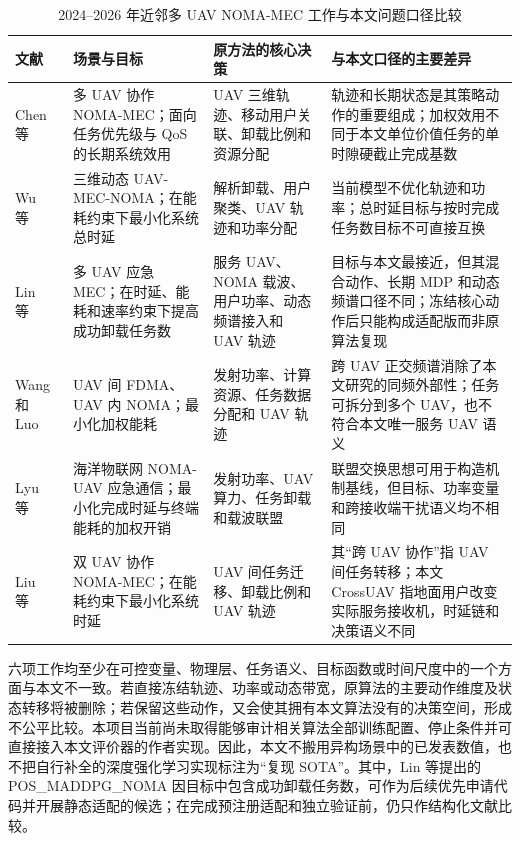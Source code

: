 \begin{table}[htbp]
  \centering
  \caption{2024--2026 年近邻多 UAV NOMA-MEC 工作与本文问题口径比较}
  \label{tab:recent-noma-uav-mec}
  \scriptsize
  \renewcommand{\arraystretch}{1.15}
  \begin{tabular}{p{1.8cm}p{3.2cm}p{4.1cm}p{4.6cm}}
    \toprule
    文献 & 场景与目标 & 原方法的核心决策 & 与本文口径的主要差异 \\
    \midrule
    Chen 等~\cite{chen2026qos} & 多 UAV 协作 NOMA-MEC；面向任务优先级与 QoS 的长期系统效用 & UAV 三维轨迹、移动用户关联、卸载比例和资源分配 & 轨迹和长期状态是其策略动作的重要组成；加权效用不同于本文单位价值任务的单时隙硬截止完成基数 \\
    Wu 等~\cite{wu2025multiagentnoma} & 三维动态 UAV-MEC-NOMA；在能耗约束下最小化系统总时延 & 解析卸载、用户聚类、UAV 轨迹和功率分配 & 当前模型不优化轨迹和功率；总时延目标与按时完成任务数目标不可直接互换 \\
    Lin 等~\cite{lin2025drlresource} & 多 UAV 应急 MEC；在时延、能耗和速率约束下提高成功卸载任务数 & 服务 UAV、NOMA 载波、用户功率、动态频谱接入和 UAV 轨迹 & 目标与本文最接近，但其混合动作、长期 MDP 和动态频谱口径不同；冻结核心动作后只能构成适配版而非原算法复现 \\
    Wang 和 Luo~\cite{wang2024energyefficient} & UAV 间 FDMA、UAV 内 NOMA；最小化加权能耗 & 发射功率、计算资源、任务数据分配和 UAV 轨迹 & 跨 UAV 正交频谱消除了本文研究的同频外部性；任务可拆分到多个 UAV，也不符合本文唯一服务 UAV 语义 \\
    Lyu 等~\cite{lyu2024computing} & 海洋物联网 NOMA-UAV 应急通信；最小化完成时延与终端能耗的加权开销 & 发射功率、UAV 算力、任务卸载和载波联盟 & 联盟交换思想可用于构造机制基线，但目标、功率变量和跨接收端干扰语义均不相同 \\
    Liu 等~\cite{liu2025trajectory} & 双 UAV 协作 NOMA-MEC；在能耗约束下最小化系统时延 & UAV 间任务迁移、卸载比例和 UAV 轨迹 & 其“跨 UAV 协作”指 UAV 间任务转移；本文 CrossUAV 指地面用户改变实际服务接收机，时延链和决策语义不同 \\
    \bottomrule
  \end{tabular}
\end{table}

六项工作均至少在可控变量、物理层、任务语义、目标函数或时间尺度中的一个方面与本文不一致。若直接冻结轨迹、功率或动态带宽，原算法的主要动作维度及状态转移将被删除；若保留这些动作，又会使其拥有本文算法没有的决策空间，形成不公平比较。本项目当前尚未取得能够审计相关算法全部训练配置、停止条件并可直接接入本文评价器的作者实现。因此，本文不搬用异构场景中的已发表数值，也不把自行补全的深度强化学习实现标注为“复现 SOTA”。其中，Lin 等提出的 POS\_MADDPG\_NOMA 因目标中包含成功卸载任务数，可作为后续优先申请代码并开展静态适配的候选；在完成预注册适配和独立验证前，仍只作结构化文献比较。

